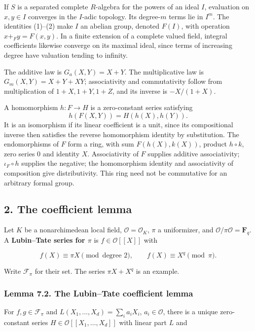 \documentclass[11pt,a4paper]{article}
\begin{document}
If \(S\) is a separated complete \(R\)-algebra for the powers of an
ideal \(I\), evaluation on \(x,y\in I\) converges in the \(I\)-adic
topology. Its degree-\(m\) terms lie in \(I^m\). The identities (1)--(2)
make \(I\) an abelian group, denoted \(F(I)\), with operation
\(x+_F y=F(x,y)\). In a finite extension of a complete valued field,
integral coefficients likewise converge on its maximal ideal, since
terms of increasing degree have valuation tending to infinity.

The additive law is \(G_a(X,Y)=X+Y\). The multiplicative law is
\(G_m(X,Y)=X+Y+XY\); associativity and commutativity follow from
multiplication of \(1+X,1+Y,1+Z\), and its inverse is \(-X/(1+X)\).

A homomorphism \(h:F\to H\) is a zero-constant series satisfying \[
h(F(X,Y))=H(h(X),h(Y)).
\] It is an isomorphism if its linear coefficient is a unit, since its
compositional inverse then satisfies the reverse homomorphism identity
by substitution. The endomorphisms of \(F\) form a ring, with sum
\(F(h(X),k(X))\), product \(h\circ k\), zero series 0 and identity
\(X\). Associativity of \(F\) supplies additive associativity;
\(\iota_F\circ h\) supplies the negative; the homomorphism identity and
associativity of composition give distributivity. This ring need not be
commutative for an arbitrary formal group.

\subsection{2. The coefficient lemma}\label{the-coefficient-lemma}

Let \(K\) be a nonarchimedean local field, \(\mathcal O=\mathcal O_K\),
\(\pi\) a uniformizer, and \(\mathcal O/\pi\mathcal O=\mathbf F_q\). A
\textbf{Lubin--Tate series for \(\pi\)} is \(f\in\mathcal O[[X]]\) with

\[
f(X)\equiv\pi X\pmod{\text{degree }2},
\qquad f(X)\equiv X^q\pmod\pi.
\tag{3}
\]

Write \(\mathcal F_\pi\) for their set. The series \(\pi X+X^q\) is an
example.

\subsubsection{Lemma 7.2. The Lubin--Tate coefficient
lemma}\label{lemma-7.2.-the-lubintate-coefficient-lemma}

For \(f,g\in\mathcal F_\pi\) and \(L(X_1,\ldots,X_d)=\sum_i a_iX_i\),
\(a_i\in\mathcal O\), there is a unique zero-constant series
\(H\in\mathcal O[[X_1,\ldots,X_d]]\) with linear part \(L\) and
\end{document}
